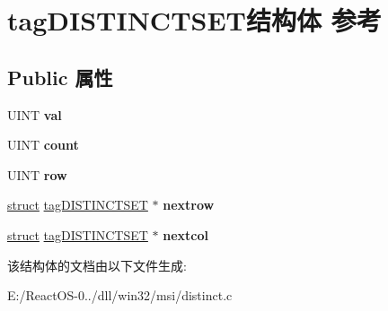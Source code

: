 \hypertarget{structtag_d_i_s_t_i_n_c_t_s_e_t}{}\section{tag\+D\+I\+S\+T\+I\+N\+C\+T\+S\+E\+T结构体 参考}
\label{structtag_d_i_s_t_i_n_c_t_s_e_t}
\subsection*{Public 属性}
\begin{DoxyCompactItemize}
\item 
\mbox{\label{structtag_d_i_s_t_i_n_c_t_s_e_t_aa870c79d50986d707de3d4c1eaa2b797}} 
U\+I\+NT {\bfseries val}
\item 
\mbox{\label{structtag_d_i_s_t_i_n_c_t_s_e_t_ac686f0c75b0073d6ce4945ea9c317d54}} 
U\+I\+NT {\bfseries count}
\item 
\mbox{\label{structtag_d_i_s_t_i_n_c_t_s_e_t_a62b47c15af99d922cb51af164665528b}} 
U\+I\+NT {\bfseries row}
\item 
\mbox{\label{structtag_d_i_s_t_i_n_c_t_s_e_t_a55dc19d0e85d9ea1bde7c7697df29ab9}} 
\hyperlink{interfacestruct}{struct} \hyperlink{structtag_d_i_s_t_i_n_c_t_s_e_t}{tag\+D\+I\+S\+T\+I\+N\+C\+T\+S\+ET} $\ast$ {\bfseries nextrow}
\item 
\mbox{\label{structtag_d_i_s_t_i_n_c_t_s_e_t_a52144658e667bfa706a517d4a29cce02}} 
\hyperlink{interfacestruct}{struct} \hyperlink{structtag_d_i_s_t_i_n_c_t_s_e_t}{tag\+D\+I\+S\+T\+I\+N\+C\+T\+S\+ET} $\ast$ {\bfseries nextcol}
\end{DoxyCompactItemize}


该结构体的文档由以下文件生成\+:\begin{DoxyCompactItemize}
\item 
E\+:/\+React\+O\+S-\/0../dll/win32/msi/distinct.\+c\end{DoxyCompactItemize}

